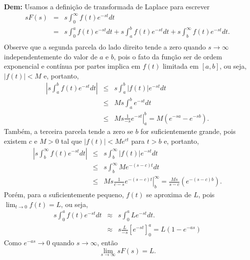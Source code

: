 \documentclass[a4paper,10pt]{book}
\begin{document}
{\bf Dem:} Usamos a definição de transformada de Laplace para escrever
 \begin{eqnarray*}
 sF(s)&=&s\int_0^\infty f(t)e^{-st}dt\\
 &=&s\int_0^a f(t)e^{-st}dt+s\int_a^b f(t)e^{-st}dt+s\int_b^\infty f(t)e^{-st}dt.\\
 \end{eqnarray*}
 Observe que a segunda parcela do lado direito tende a zero quando $s\to \infty$ independentemente do valor de $a$ e $b$, pois o fato da função ser de ordem exponencial e contínua por partes implica em $f(t)$ limitada em $[a,b]$, ou seja, $|f(t)|<M$ e, portanto,
 \begin{eqnarray*}
 \left|s\int_a^b f(t)e^{-st}dt\right|&\leq & s\int_a^b |f(t)|e^{-st}dt\\
 &\leq & Ms\int_a^b e^{-st}dt\\
 &\leq & \left.Ms\frac{1}{-s} e^{-st}\right|_a^b=M(e^{-sa}-e^{-sb}).
 \end{eqnarray*}
 Também, a terceira parcela tende a zero se $b$ for suficientemente grande, pois existem $c$ e $M>0$ tal que $|f(t)|<Me^{ct}$ para $t>b$ e, portanto,
 \begin{eqnarray*}
 \left|s\int_b^\infty f(t)e^{-st}dt\right|&\leq & s\int_b^\infty |f(t)|e^{-st}dt\\
 &\leq & s\int_b^\infty Me^{-(s-c)t}dt\\
 &\leq & \left.Ms\frac{1}{c-s} e^{-(s-c)t}\right|_b^\infty=\frac{Ms}{s-c}(e^{-(s-c)b}).
 \end{eqnarray*}
 Porém, para $a$ suficientemente pequeno, $f(t)$ se aproxima de $L$, pois $\displaystyle \lim_{t\to 0}f(t)=L$, ou seja,
 \begin{eqnarray*}
 s\int_0^a f(t)e^{-st}dt &\approx &s\int_0^a L e^{-st}dt.\\
 &\approx &s\frac{L}{-s}\left[ e^{-st}\right]_0^a=L\left(1-e^{-as}\right)
 \end{eqnarray*}
 Como $e^{-as}\to 0$ quando $s\to \infty$, então
 \begin{equation}
 \lim_{s\to \infty} sF(s)=L.
 \end{equation} 


 
\end{document}
